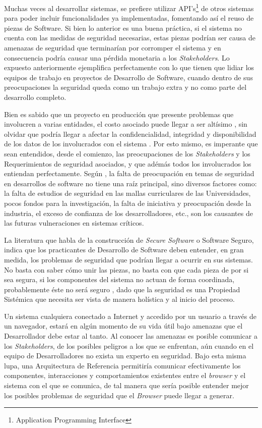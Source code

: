Muchas veces al desarrollar sistemas, se prefiere utilizar API's\footnote{Application Programming Interface} de otros sistemas para poder incluir funcionalidades ya implementadas, fomentando así el reuso de piezas de Software. Si bien lo anterior es una buena práctica, si el sistema no cuenta con las medidas de seguridad necesarias, estas piezas podrían ser causa de amenazas de seguridad que terminarían por corromper el sistema y en consecuencia podría causar una pérdida monetaria a los \textit{Stakeholders}. Lo expuesto anteriormente ejemplifica perfectamente con lo que tienen que lidiar los equipos de trabajo en proyectos de Desarrollo de Software, cuando dentro de sus preocupaciones la seguridad queda como un trabajo extra y no como parte del desarrollo completo. 

Bien es sabido que un proyecto en producción que presente problemas que involucren a varias entidades, el costo asociado puede llegar a ser altísimo \cite{cert}, sin olvidar que podría llegar a afectar la confidencialidad, integridad y disponibilidad de los datos de los involucrados con el sistema  \cite{interCoursera}. Por esto mismo, es imperante que sean entendidos, desde el comienzo, las preocupaciones de los \textit{Stakeholders} y los Requerimientos de seguridad asociados, y que adémás todos los involucrados los entiendan perfectamente. Según \cite{WhyteHarrison}, la falta de preocupación en temas de seguridad en desarrollos de software no tiene una raíz principal, sino diversos factores como: la falta de estudios de seguridad en las mallas curriculares de las Universidades, pocos fondos para la investigación, la falta de iniciativa y preocupación desde la industria, el exceso de confianza de los desarrolladores, etc., son los causantes de las futuras vulneraciones en sistemas críticos. 

La literatura que habla de la construcción de \textit{Secure Software} o Software Seguro, indica que los practicantes de Desarrollo de Software deben entender, en gran medida, los problemas de seguridad que podrían llegar a ocurrir en sus sistemas. No basta con saber cómo unir las piezas, no basta con que cada pieza de por si sea segura, si los componentes del sistema no actuan de forma coordinada, probablemente éste no será seguro \cite{fernandez2013security}, dado que la seguridad es una Propiedad Sistémica que necesita ser vista de manera holística y al inicio del proceso.

Un sistema cualquiera conectado a Internet y accedido por un usuario a través de un navegador, estará en algún momento de su vida útil bajo amenazas que el Desarrollador debe estar al tanto. Al conocer las amenazas es posible comunicar a los \textit{Stakeholders}, de los posibles peligros a los que se enfrentan, aún cuando en el equipo de Desarrolladores no exista un experto en seguridad. Bajo esta misma lupa, una Arquitectura de Referencia permitiría comunicar efectivamente los componentes, interacciones y comportamientos existentes entre el \textit{browser} y el sistema con el que se comunica, de tal manera que sería posible entender mejor los posibles problemas de seguridad que el \textit{Browser} puede llegar a generar. 

